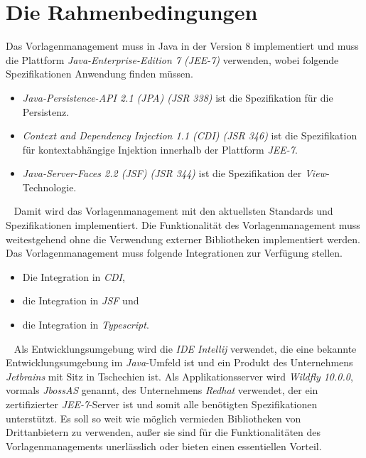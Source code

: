 \section{Die Rahmenbedingungen}
Das Vorlagenmanagement muss in Java in der Version 8 implementiert und muss die Plattform \emph{Java-Enterprise-Edition 7 (JEE-7)} verwenden, wobei folgende Spezifikationen Anwendung finden müssen.
\begin{itemize}
	\item \emph{Java-Persistence-API 2.1 (JPA) (JSR 338)}
	\newline
	ist die Spezifikation für die Persistenz.
	\item \emph{Context and Dependency Injection 1.1 (CDI) (JSR 346)}
	\newline
	ist die Spezifikation für kontextabhängige Injektion innerhalb der Plattform \emph{JEE-7}.
	\item \emph{Java-Server-Faces 2.2 (JSF) (JSR 344)} 
	\newline
	ist die Spezifikation der \emph{View}-Technologie. 
\end{itemize}
\ \newline
Damit wird das Vorlagenmanagement mit den aktuellsten Standards und Spezifikationen implementiert. Die Funktionalität des Vorlagenmanagement muss weitestgehend ohne die Verwendung externer Bibliotheken implementiert werden. Das Vorlagenmanagement muss folgende Integrationen zur Verfügung stellen.
\begin{itemize}
	\item Die Integration in \emph{CDI},
	\item die Integration in \emph{JSF} und
	\item die Integration in \emph{Typescript}.
\end{itemize} 
\ \newline
Als Entwicklungsumgebung wird die \emph{IDE Intellij} verwendet, die eine bekannte Entwicklungsumgebung im \emph{Java}-Umfeld ist und ein Produkt des Unternehmens \emph{Jetbrains} mit Sitz in Tschechien ist. Als Applikationsserver wird \emph{Wildfly 10.0.0}, vormals \emph{JbossAS} genannt, des Unternehmens \emph{Redhat} verwendet, der ein zertifizierter \emph{JEE-7}-Server ist und somit alle benötigten Spezifikationen unterstützt. Es soll so weit wie möglich vermieden Bibliotheken von Drittanbietern zu verwenden, außer sie sind für die Funktionalitäten des Vorlagenmanagements unerlässlich oder bieten einen essentiellen Vorteil.
